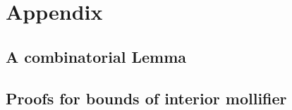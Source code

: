 \appendix
\chapter{Appendix}
\section{A combinatorial Lemma}
\label{ap:combilemma}


\section{Proofs for bounds of interior mollifier}
\label{ap:Dphibound_boundpf}

\newpage\null\newpage\null\thispagestyle{empty}